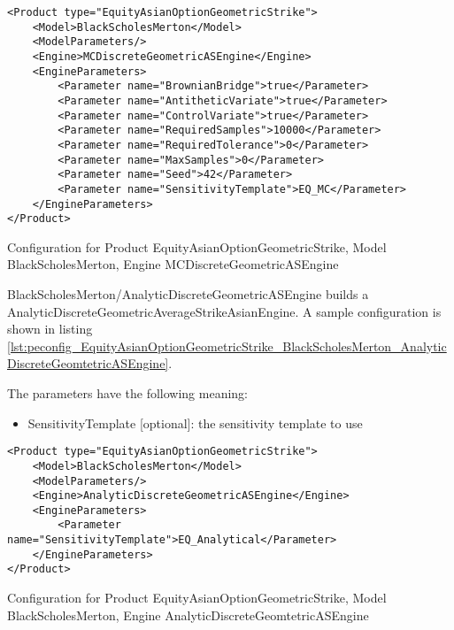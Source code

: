 \begin{longlisting}
\begin{verbatim}
<Product type="EquityAsianOptionGeometricStrike">
    <Model>BlackScholesMerton</Model>
    <ModelParameters/>
    <Engine>MCDiscreteGeometricASEngine</Engine>
    <EngineParameters>
        <Parameter name="BrownianBridge">true</Parameter>    
        <Parameter name="AntitheticVariate">true</Parameter>    
        <Parameter name="ControlVariate">true</Parameter>    
        <Parameter name="RequiredSamples">10000</Parameter>    
        <Parameter name="RequiredTolerance">0</Parameter>    
        <Parameter name="MaxSamples">0</Parameter>    
        <Parameter name="Seed">42</Parameter>    
        <Parameter name="SensitivityTemplate">EQ_MC</Parameter>
    </EngineParameters>
</Product>
\end{verbatim}
\caption{Configuration for Product EquityAsianOptionGeometricStrike, Model BlackScholesMerton, Engine MCDiscreteGeometricASEngine}
\label{lst:peconfig_EquityAsianOptionGeometricStrike_BlackScholesMerton_MCDiscreteGeomtetricASEngine}
\end{longlisting}

BlackScholesMerton/AnalyticDiscreteGeometricASEngine builds a AnalyticDiscreteGeometricAverageStrikeAsianEngine. A sample
configuration is shown in listing
\ref{lst:peconfig_EquityAsianOptionGeometricStrike_BlackScholesMerton_AnalyticDiscreteGeomtetricASEngine}.

The parameters have the following meaning:

\begin{itemize}
\item SensitivityTemplate [optional]: the sensitivity template to use 
\end{itemize}

\begin{longlisting}
\begin{verbatim}
<Product type="EquityAsianOptionGeometricStrike">
    <Model>BlackScholesMerton</Model>
    <ModelParameters/>
    <Engine>AnalyticDiscreteGeometricASEngine</Engine>
    <EngineParameters>
        <Parameter name="SensitivityTemplate">EQ_Analytical</Parameter>
    </EngineParameters>
</Product>
\end{verbatim}
\caption{Configuration for Product EquityAsianOptionGeometricStrike, Model BlackScholesMerton, Engine AnalyticDiscreteGeomtetricASEngine}
\label{lst:peconfig_EquityAsianOptionGeometricStrike_BlackScholesMerton_AnalyticDiscreteGeomtetricASEngine}
\end{longlisting}

